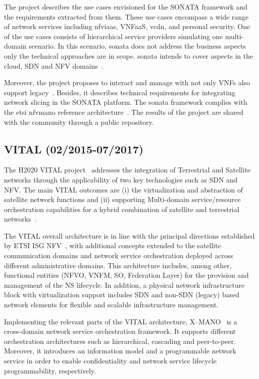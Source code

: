 The project describes the use cases envisioned for the SONATA framework and the requirements extracted from them. These use cases encompass a wide range of network services including \gls{nfviaas}, VNFaaS,  v\gls{cdn}, and personal security. One of the use cases consists of hierarchical service providers simulating one multi-domain scenario. In this scenario, \gls{sonata} does not address the business aspects only the technical approaches are in scope. \gls{sonata} intends to cover aspects in the cloud, SDN and NFV domains~\cite{SONATAProject2015D2.2Design}.

Moreover, the project proposes to interact and manage with not only VNFs also support legacy~\cite{SONATAProject2016D2.3Design}. Besides, it describes technical requirements for integrating network slicing in the SONATA platform.  The \gls{sonata} framework complies with the \gls{etsi} \gls{nfvmano} reference architecture~\cite{SONATAProject2016D2.3Design}. The results of the project are shared with the community through a public repository.

\subsection{VITAL (02/2015-07/2017)}

The H2020 VITAL project~\cite{vital} addresses the integration of Terrestrial and Satellite networks through the applicability of two key technologies such as SDN and NFV. The main VITAL outcomes are (i) the virtualization and abstraction of satellite network functions and (ii) supporting Multi-domain service/resource orchestration capabilities for a hybrid combination of satellite and terrestrial networks~\cite{vitalD23}. 

The VITAL overall architecture is in line with the principal directions established by ETSI ISG NFV~\cite{ETSIIndustrySpecificationGroupISGNFV2013NetworkFramework}, with additional concepts extended to the satellite communication domains and network service orchestration deployed across different administrative domains. This architecture includes, among other, functional entities (NFVO, VNFM, SO, Federation Layer) for the provision and management of the NS lifecycle. In addition, a physical network infrastructure block with virtualization support includes SDN and non-SDN (legacy) based network elements for flexible and scalable infrastructure management.

Implementing the relevant parts of the VITAL architecture, X--MANO~\cite{francescon2017x} is a cross-domain network service orchestration framework. It supports different orchestration architectures such as hierarchical, cascading and peer-to-peer. Moreover, it introduces an information model and a programmable network service in order to enable confidentiality and network service lifecycle programmability, respectively.

